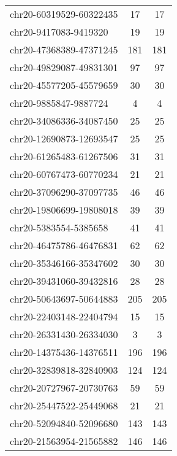 \begin{longtable}{lSS}
	chr20-60319529-60322435 & 17     & 17                         \\
	chr20-9417083-9419320   & 19     & 19                         \\
	chr20-47368389-47371245 & 181    & 181                        \\
	chr20-49829087-49831301 & 97     & 97                         \\
	chr20-45577205-45579659 & 30     & 30                         \\
	chr20-9885847-9887724   & 4      & 4                          \\
	chr20-34086336-34087450 & 25     & 25                         \\
	chr20-12690873-12693547 & 25     & 25                         \\
	chr20-61265483-61267506 & 31     & 31                         \\
	chr20-60767473-60770234 & 21     & 21                         \\
	chr20-37096290-37097735 & 46     & 46                         \\
	chr20-19806699-19808018 & 39     & 39                         \\
	chr20-5383554-5385658   & 41     & 41                         \\
	chr20-46475786-46476831 & 62     & 62                         \\
	chr20-35346166-35347602 & 30     & 30                         \\
	chr20-39431060-39432816 & 28     & 28                         \\
	chr20-50643697-50644883 & 205    & 205                        \\
	chr20-22403148-22404794 & 15     & 15                         \\
	chr20-26331430-26334030 & 3      & 3                          \\
	chr20-14375436-14376511 & 196    & 196                        \\
	chr20-32839818-32840903 & 124    & 124                        \\
	chr20-20727967-20730763 & 59     & 59                         \\
	chr20-25447522-25449068 & 21     & 21                         \\
	chr20-52094840-52096680 & 143    & 143                        \\
	chr20-21563954-21565882 & 146    & 146                        \\

\end{longtable}
